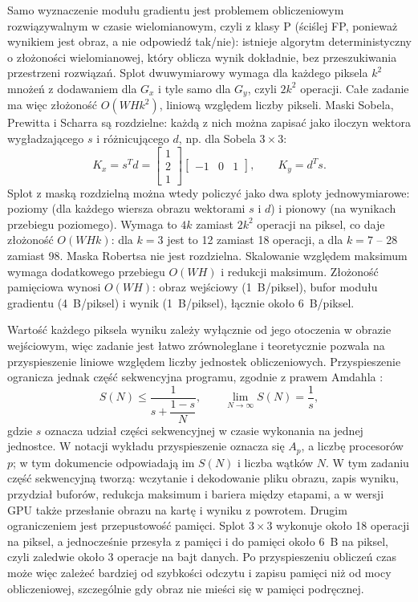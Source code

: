 \documentclass[12pt,a4paper]{article}
\begin{document}
Samo wyznaczenie modułu gradientu jest problemem obliczeniowym rozwiązywalnym w czasie wielomianowym, czyli z klasy P (ściślej FP, ponieważ wynikiem jest obraz, a nie odpowiedź tak/nie): istnieje algorytm deterministyczny o złożoności wielomianowej, który oblicza wynik dokładnie, bez przeszukiwania przestrzeni rozwiązań. Splot dwuwymiarowy wymaga dla każdego piksela $k^2$ mnożeń z dodawaniem dla $G_x$ i tyle samo dla $G_y$, czyli $2k^2$ operacji. Całe zadanie ma więc złożoność $O(W H k^{2})$, liniową względem liczby pikseli. Maski Sobela, Prewitta i Scharra są rozdzielne: każdą z nich można zapisać jako iloczyn wektora wygładzającego $s$ i różnicującego $d$, np. dla Sobela $3\times3$:
\begin{equation}
	K_x = s^{T} d = \begin{bmatrix} 1 \\ 2 \\ 1 \end{bmatrix} \begin{bmatrix} -1 & 0 & 1 \end{bmatrix},
	\qquad K_y = d^{T} s.
\end{equation}
Splot z maską rozdzielną można wtedy policzyć jako dwa sploty jednowymiarowe: poziomy (dla każdego wiersza obrazu wektorami $s$ i $d$) i pionowy (na wynikach przebiegu poziomego). Wymaga to $4k$ zamiast $2k^2$ operacji na piksel, co daje złożoność $O(W H k)$: dla $k = 3$ jest to 12 zamiast 18 operacji, a dla $k = 7$ -- 28 zamiast 98. Maska Robertsa nie jest rozdzielna. Skalowanie względem maksimum wymaga dodatkowego przebiegu $O(W H)$ i redukcji maksimum. Złożoność pamięciowa wynosi $O(W H)$: obraz wejściowy (1~B/piksel), bufor modułu gradientu (4~B/piksel) i wynik (1~B/piksel), łącznie około 6~B/piksel.

Wartość każdego piksela wyniku zależy wyłącznie od jego otoczenia w obrazie wejściowym, więc zadanie jest łatwo zrównoleglane i teoretycznie pozwala na przyspieszenie liniowe względem liczby jednostek obliczeniowych. Przyspieszenie ogranicza jednak część sekwencyjna programu, zgodnie z prawem Amdahla \cite{amdahl,czech}:
\begin{equation}
	S(N) \le \frac{1}{s + \dfrac{1 - s}{N}}, \qquad \lim_{N \to \infty} S(N) = \frac{1}{s},
	\label{eq:amdahl}
\end{equation}
gdzie $s$ oznacza udział części sekwencyjnej w czasie wykonania na jednej jednostce. W notacji wykładu \cite{wojcik} przyspieszenie oznacza się $A_p$, a liczbę procesorów $p$; w tym dokumencie odpowiadają im $S(N)$ i liczba wątków $N$. W tym zadaniu część sekwencyjną tworzą: wczytanie i dekodowanie pliku obrazu, zapis wyniku, przydział buforów, redukcja maksimum i bariera między etapami, a w wersji GPU także przesłanie obrazu na kartę i wyniku z powrotem. Drugim ograniczeniem jest przepustowość pamięci. Splot $3 \times 3$ wykonuje około 18 operacji na piksel, a jednocześnie przesyła z pamięci i do pamięci około 6~B na piksel, czyli zaledwie około 3 operacje na bajt danych. Po przyspieszeniu obliczeń czas może więc zależeć bardziej od szybkości odczytu i zapisu pamięci niż od mocy obliczeniowej, szczególnie gdy obraz nie mieści się w pamięci podręcznej.
\end{document}

